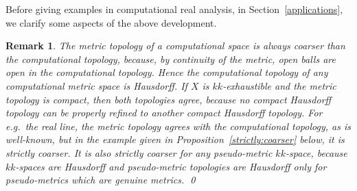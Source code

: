 \documentclass[10pt]{article}
\newtheorem{Rem}[cor]{Remark}
\newenvironment{rem}{\begin{Rem}\em}{\end{Rem}}
\begin{document}
Before giving examples in computational real analysis, in
Section~\ref{applications}, we clarify some aspects of the above
development.
\begin{rem} \label{firstly} The metric topology of a computational
  space is always coarser than the computational topology, because, by
  continuity of the metric, open balls are open in the computational
  topology. Hence the computational topology of any computational
  metric space is Hausdorff. If $X$ is $kk$-exhaustible and the metric
  topology is compact, then both topologies agree, because no compact
  Hausdorff topology can be properly refined to another compact
  Hausdorff topology.  For e.g.\ the real line, the metric topology
  agrees with the computational topology, as is well-known, but in the
  example given in Proposition~\ref{strictly:coarser} below, it is
  strictly coarser.  It is also strictly coarser for any pseudo-metric
  $kk$-space, because $kk$-spaces are Hausdorff and pseudo-metric
  topologies are Hausdorff only for pseudo-metrics which are genuine
  metrics.  \qed
\end{rem}
\end{document}
